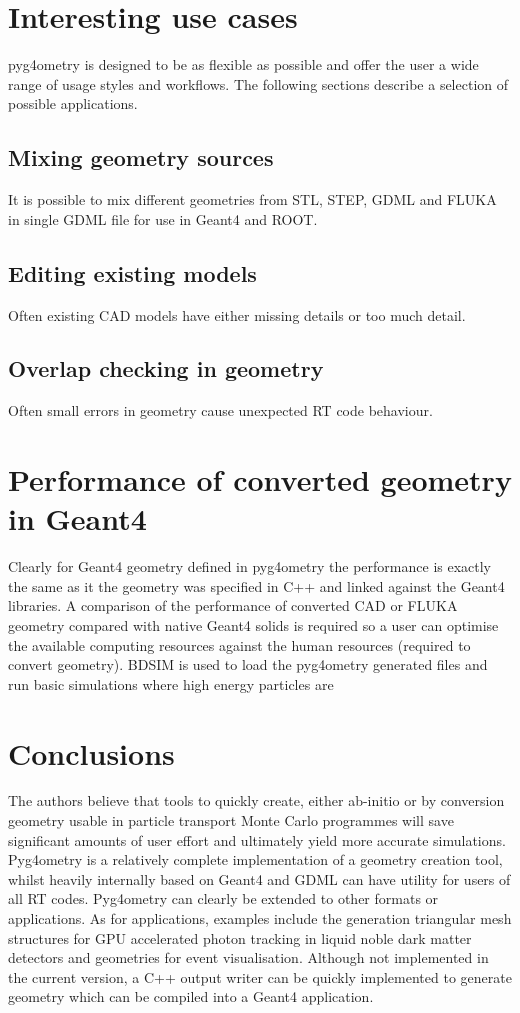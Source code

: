 \documentclass[final,5p,times,twocolumn]{elsarticle}
\begin{document}
\section{Interesting use cases}
pyg4ometry is designed to be as flexible as possible and offer the user a wide range of usage styles and workflows. The following sections describe a selection of 
possible applications.

\subsection{Mixing geometry sources}
It is possible to mix different geometries from STL, STEP, GDML and FLUKA in single GDML file for use in Geant4 and ROOT. 

\subsection{Editing existing models}
Often existing CAD models have either missing details or too much detail. 

\subsection{Overlap checking in geometry}
Often small errors in geometry cause unexpected RT code behaviour.  


\section{Performance of converted geometry in Geant4}
Clearly for Geant4 geometry defined in pyg4ometry the performance is exactly the same as it the geometry was specified in C++ and linked against the Geant4
libraries. A comparison of the performance of converted CAD or FLUKA geometry compared with native Geant4 solids is required so a user can optimise the available
computing resources against the human resources (required to convert geometry). BDSIM is used to load the pyg4ometry generated files  and run basic simulations where 
high energy particles are   

\section{Conclusions}
The authors believe that tools to quickly create, either ab-initio or by conversion geometry usable in particle transport Monte Carlo programmes will save significant 
amounts of user effort and ultimately yield more accurate simulations. Pyg4ometry is a relatively complete implementation of a geometry creation tool, whilst heavily 
internally based on Geant4 and GDML can have utility for users of all RT codes. Pyg4ometry can clearly be extended to other formats or applications. As for applications,
examples include  the  generation triangular mesh structures for GPU accelerated photon tracking in liquid noble  dark matter detectors and geometries for event visualisation. 
Although not implemented in the current version, a C++ output writer can be quickly implemented to generate geometry which can be compiled into a Geant4 application. 
\end{document}
